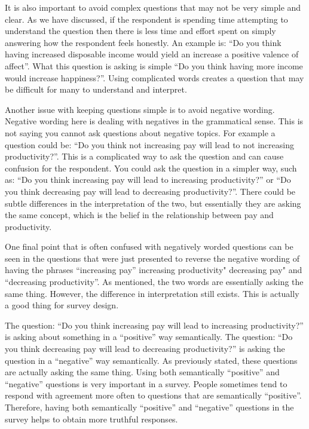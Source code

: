\documentclass[]{book}
\theoremstyle{definition}
\theoremstyle{definition}
\theoremstyle{definition}
\theoremstyle{remark}
\begin{document}
It is also important to avoid complex questions that may not be very
simple and clear. As we have discussed, if the respondent is spending
time attempting to understand the question then there is less time and
effort spent on simply answering how the respondent feels honestly. An
example is: ``Do you think having increased disposable income would
yield an increase a positive valence of affect''. What this question is
asking is simple ``Do you think having more income would increase
happiness?''. Using complicated words creates a question that may be
difficult for many to understand and interpret.

Another issue with keeping questions simple is to avoid negative
wording. Negative wording here is dealing with negatives in the
grammatical sense. This is not saying you cannot ask questions about
negative topics. For example a question could be: ``Do you think not
increasing pay will lead to not increasing productivity?''. This is a
complicated way to ask the question and can cause confusion for the
respondent. You could ask the question in a simpler way, such as: ``Do
you think increasing pay will lead to increasing productivity?'' or ``Do
you think decreasing pay will lead to decreasing productivity?''. There
could be subtle differences in the interpretation of the two, but
essentially they are asking the same concept, which is the belief in the
relationship between pay and productivity.

One final point that is often confused with negatively worded questions
can be seen in the questions that were just presented to reverse the
negative wording of having the phrases ``increasing pay'' increasing
productivity" decreasing pay" and ``decreasing productivity''. As
mentioned, the two words are essentially asking the same thing. However,
the difference in interpretation still exists. This is actually a good
thing for survey design.

The question: ``Do you think increasing pay will lead to increasing
productivity?'' is asking about something in a ``positive'' way
semantically. The question: ``Do you think decreasing pay will lead to
decreasing productivity?'' is asking the question in a ``negative'' way
semantically. As previously stated, these questions are actually asking
the same thing. Using both semantically ``positive'' and ``negative''
questions is very important in a survey. People sometimes tend to
respond with agreement more often to questions that are semantically
``positive''. Therefore, having both semantically ``positive'' and
``negative'' questions in the survey helps to obtain more truthful
responses.
\end{document}
